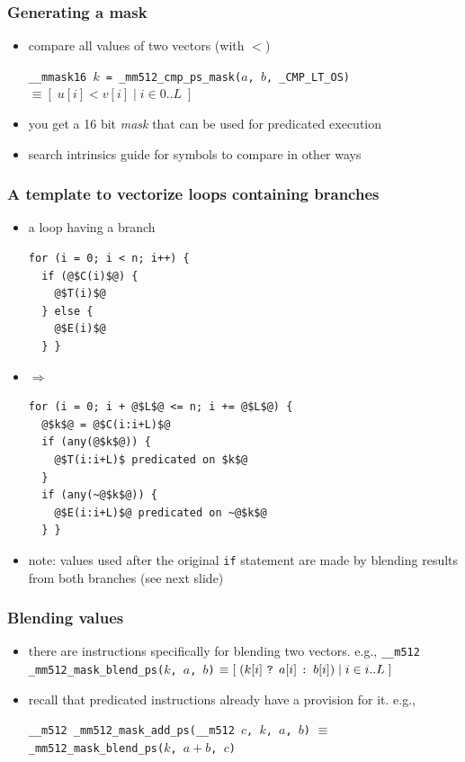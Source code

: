 \documentclass[12pt,dvipdfmx]{beamer}
\begin{document}
\begin{frame}[fragile]
  \frametitle{Generating a mask}
  \begin{itemize}
  \item compare all values of two vectors (with $<$)

    {\tt \_\_mmask16 $k$ = \_mm512\_cmp\_ps\_mask($a$, $b$, \_CMP\_LT\_OS)}
    $\equiv [\;u[i] < v[i]\;|\; i \in 0..L\;]$
  \item you get a 16 bit {\it mask} that can be used for
    predicated execution
  \item search intrinsics guide for symbols to compare in other ways
  \end{itemize}
\end{frame}
    
\begin{frame}[fragile]
  \frametitle{A template to vectorize loops containing branches}
  \begin{itemize}
  \item a loop having a branch
\begin{lstlisting}
for (i = 0; i < n; i++) {
  if (@$C(i)$@) {
    @$T(i)$@
  } else {
    @$E(i)$@
  } }  
\end{lstlisting}
\item $\Rightarrow$
\begin{lstlisting}
for (i = 0; i + @$L$@ <= n; i += @$L$@) {
  @$k$@ = @$C(i:i+L)$@
  if (any(@$k$@)) {
    @$T(i:i+L)$ predicated on $k$@
  }
  if (any(~@$k$@)) {
    @$E(i:i+L)$@ predicated on ~@$k$@
  } }  
\end{lstlisting}

\item note: values used after the original {\tt if} statement
  are made by blending results from both branches (see next slide)
\end{itemize}
\end{frame}

\begin{frame}[fragile]
  \frametitle{Blending values}
  \begin{itemize}
  \item there are instructions specifically for blending two vectors. e.g.,
    {\tt \_\_m512 \_mm512\_mask\_blend\_ps($k$, $a$, $b$)}
    $\equiv [\; (k[i] \mbox{ {\tt ?} } a[i] \mbox{ {\tt :} } b[i]) \;|\; i \in i..L \;]$
    
  \item recall that predicated instructions already have a provision for it. e.g., 

    {\tt \_\_m512 \_mm512\_mask\_add\_ps(\_\_m512 $c$, $k$, $a$, $b$)} $\equiv$
    {\tt \_mm512\_mask\_blend\_ps($k$, $a + b$, $c$)}
  \end{itemize}
\end{frame}
\end{document}
